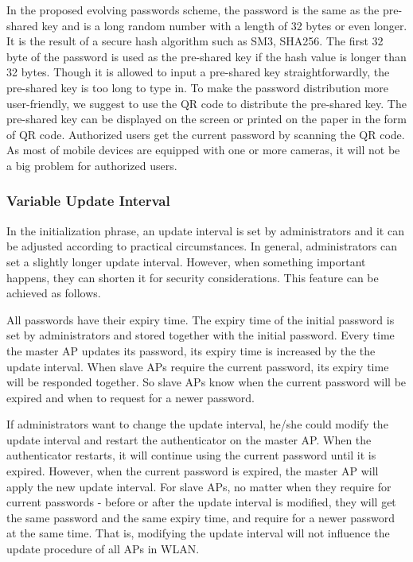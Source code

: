 In the proposed evolving passwords scheme, the password is the same as the pre-shared key and is a long random number with a length of 32 bytes or even longer. It is the result of a secure hash algorithm such as SM3, SHA256. The first 32 byte of the password is used as the pre-shared key if the hash value is longer than 32 bytes. Though it is allowed to input a pre-shared key straightforwardly, the pre-shared key is too long to type in. To make the password distribution more user-friendly, we suggest to use the QR code to distribute the pre-shared key. The pre-shared key can be displayed on the screen or printed on the paper in the form of QR code. Authorized users get the current password by scanning the QR code. As most of mobile devices are equipped with one or more cameras, it will not be a big problem for authorized users. 

\subsubsection{Variable Update Interval}
In the initialization phrase, an update interval is set by administrators and it can be adjusted according to practical circumstances. In general, administrators can set a slightly longer update interval. However, when something important happens, they can shorten it for security considerations. This feature can be achieved as follows. 

All passwords have their expiry time. The expiry time of the initial password is set by administrators and stored together with the initial password. Every time the master AP updates its password, its expiry time is increased by the the update interval. When slave APs require the current password, its expiry time will be responded together. So slave APs know when the current password will be expired and when to request for a newer password. 

If administrators want to change the update interval, he/she could modify the update interval and restart the authenticator on the master AP. When the authenticator restarts, it will continue using the current password until it is expired. However, when the current password is expired, the master AP will apply the new update interval. For slave APs, no matter when they require for current passwords - before or after the update interval is modified, they will get the same password and the same expiry time, and require for a newer password at the same time. That is, modifying the update interval will not influence the update procedure of all APs in WLAN. 

